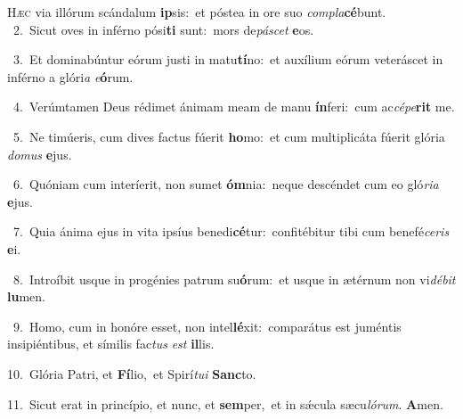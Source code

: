 \lettrine{\initial\textcolor{\initialcolor}{H}}{æc} via illórum scándalum \textbf{ip}\-sis:~\star et póstea in ore suo \textit{com}\-\textit{pla}\textbf{cé}bunt.\\
{\numbfont\textcolor{\numbcolor}{~2.}}~Sicut oves in inférno pósi\textbf{ti} sunt:~\star mors de\-\textit{pá}\-\textit{scet} \textbf{e}\-os.\par
{\numbfont\textcolor{\numbcolor}{~3.}}~Et dominabúntur eórum justi in matu\-\textbf{tí}\-no:~\star et auxílium eórum veteráscet in inférno a glóri\textit{a} \textit{e}\-\textbf{ó}rum.\par
{\numbfont\textcolor{\numbcolor}{~4.}}~Verúmtamen Deus rédimet ánimam meam de manu \textbf{ín}\-feri:~\star cum ac\-\textit{cé}\-\textit{pe}\textbf{rit} me.\par
{\numbfont\textcolor{\numbcolor}{~5.}}~Ne timúeris, cum dives factus fúerit \textbf{ho}\-mo:~\star et cum multiplicáta fúerit glória \textit{do}\-\textit{mus} \textbf{e}\-jus.\par
{\numbfont\textcolor{\numbcolor}{~6.}}~Quóniam cum interíerit, non sumet \textbf{óm}\-nia:~\star neque descéndet cum eo gló\-\textit{ri}\-\textit{a} \textbf{e}\-jus.\par
{\numbfont\textcolor{\numbcolor}{~7.}}~Quia ánima ejus in vita ipsíus benedi\-\textbf{cé}\-tur:~\star confitébitur tibi cum benefé\-\textit{ce}\-\textit{ris} \textbf{e}\-i.\par
{\numbfont\textcolor{\numbcolor}{~8.}}~Introíbit usque in progénies patrum su\-\textbf{ó}\-rum:~\star et usque in ætérnum non vi\-\textit{dé}\-\textit{bit} \textbf{lu}\-men.\par
{\numbfont\textcolor{\numbcolor}{~9.}}~Homo, cum in honóre esset, non intel\-\textbf{lé}\-xit:~\star comparátus est juméntis insipiéntibus, et símilis fac\textit{tus} \textit{est} \textbf{il}\-lis.\par
{\numbfont\textcolor{\numbcolor}{10.}}~Glória Patri, et \textbf{Fí}\-lio,~\star et Spirí\-\textit{tu}\-\textit{i} \textbf{Sanc}\-to.\par
{\numbfont\textcolor{\numbcolor}{11.}}~Sicut erat in princípio, et nunc, et \textbf{sem}\-per,~\star et in sǽcula sæcu\-\textit{ló}\-\textit{rum}. \textbf{A}\-men.\par

